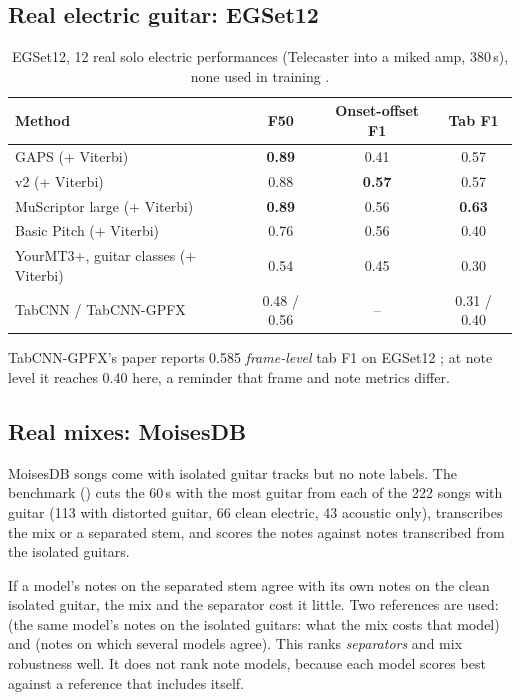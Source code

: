 \subsection{Real electric guitar: EGSet12}

\begin{table}[h]
\centering
\caption{EGSet12, 12 real solo electric performances (Telecaster into a miked
amp, 380\,s), none used in training \measured.}
\label{tab:egset12}
\small
\begin{tabular}{@{}lccc@{}}
\toprule
Method & F50 & Onset-offset F1 & Tab F1 \\
\midrule
GAPS (+ Viterbi) & \textbf{0.89} & 0.41 & 0.57 \\
v2 (+ Viterbi) & 0.88 & \textbf{0.57} & 0.57 \\
MuScriptor large (+ Viterbi) & \textbf{0.89} & 0.56 & \textbf{0.63} \\
Basic Pitch (+ Viterbi) & 0.76 & 0.56 & 0.40 \\
YourMT3+, guitar classes (+ Viterbi) & 0.54 & 0.45 & 0.30 \\
TabCNN / TabCNN-GPFX & 0.48 / 0.56 & -- & 0.31 / 0.40 \\
\bottomrule
\end{tabular}
\end{table}

TabCNN-GPFX's paper reports 0.585 \emph{frame-level} tab F1 on EGSet12
\reported; at note level it reaches 0.40 here, a reminder that frame and note
metrics differ.

\subsection{Real mixes: MoisesDB}
\label{sec:bench-moises}

MoisesDB songs come with isolated guitar tracks but no note labels. The
benchmark () cuts the 60\,s with the most guitar from
each of the 222 songs with guitar (113 with distorted guitar, 66 clean
electric, 43 acoustic only), transcribes the mix or a separated stem, and scores
the notes against notes transcribed from the isolated guitars.

\begin{keyidea}
If a model's notes on the separated stem agree with its own notes on the clean
isolated guitar, the mix and the separator cost it little. Two references are
used:  (the same model's notes on the isolated guitars: what the mix
costs that model) and  (notes on which several models agree).
This ranks \emph{separators} and mix robustness well. It does not rank note
models, because each model scores best against a reference that includes
itself.
\end{keyidea}


